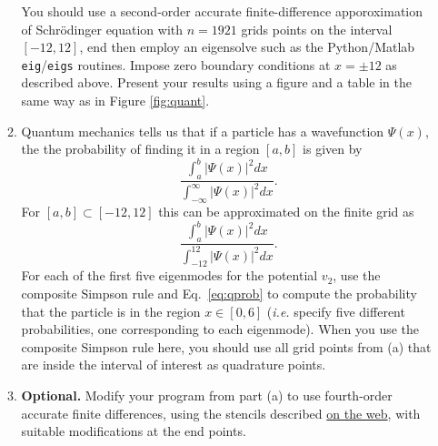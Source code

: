 \documentclass[11pt]{article}
\begin{document}
\begin{enumerate}
\begin{enumerate}
\begin{enumerate}
	\end{enumerate}
	You should use a second-order accurate
	finite-difference apporoximation of Schr\"odinger equation with
	$n=1921$ grids points on the interval $[-12,12]$, end then employ an
	eigensolve such as the Python/Matlab \texttt{eig}/\texttt{eigs}
	routines. Impose zero boundary conditions at $x=\pm 12$ as described
	above. Present your results using a figure and a table in the same way
	as in Figure \ref{fig:quant}. 
      \item Quantum mechanics tells us that if a particle has a wavefunction $\Psi(x)$,
	the the probability of finding it in a region $[a,b]$ is given by
	\begin{equation}
	  \frac{\int_a^b |\Psi(x)|^2 dx}{\int_{-\infty}^\infty |\Psi(x)|^2 dx}.
	\end{equation}
	For $[a,b] \subset [-12,12]$ this can be approximated on the finite
	grid as
	\begin{equation}
	  \frac{\int_a^b |\Psi(x)|^2 dx}{\int_{-12}^{12} |\Psi(x)|^2 dx}.\label{eq:qprob}
	\end{equation}
	For each of the first five eigenmodes for the potential $v_2$, use the
	composite Simpson rule and Eq.~\ref{eq:qprob} to compute the probability that the
	particle is in the region $x \in [0,6]$ (\textit{i.e.} specify five different
	probabilities, one corresponding to each eigenmode). When you use the
	composite Simpson rule here, you should use all grid points from (a)
	that are inside the interval of interest as quadrature points.
      \item \textbf{Optional.} Modify your program from part (a) to use
	fourth-order accurate finite differences, using the stencils described
	\href{http://en.wikipedia.org/wiki/Finite_difference_coefficient}{on
	the web}, with suitable modifications at the end points.
    \end{enumerate}
\end{enumerate}
\end{document}
